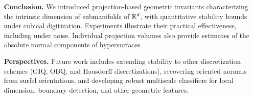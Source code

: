 \noindent\textbf{Conclusion.}
We introduced projection-based geometric invariants
characterizing the intrinsic dimension of submanifolds
of $\mathbb{R}^d$, with quantitative stability bounds under
cubical digitization. Experiments illustrate their
practical effectiveness, including under noise.
Individual projection volumes also provide estimates
of the absolute normal components of hypersurfaces.

\noindent\textbf{Perspectives.}
Future work includes extending stability to other
discretization schemes (GIQ, OBQ, and Hausdorff
discretizations), recovering oriented normals from
surfel orientations, and developing robust multiscale classifiers
for local dimension, boundary detection, and other
geometric features.





